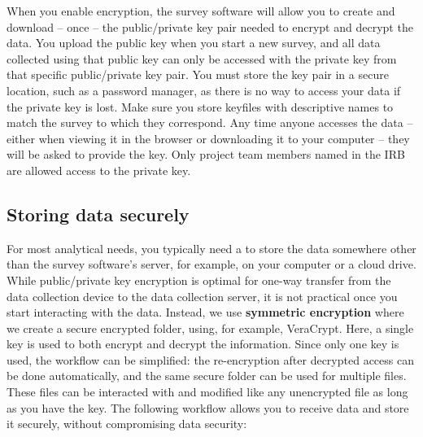 When you enable encryption, the survey software will allow you to create and
download -- once -- the public/private key pair needed to encrypt and decrypt the data.
You upload the public key when you start a new survey, and all data collected using that
public key can only be accessed with the private key from that specific public/private key pair.
You must store the key pair in a secure location, such as a password manager,
as there is no way to access your data if the private key is lost.
Make sure you store keyfiles with descriptive names to match the survey to which they correspond.
Any time anyone accesses the data --
either when viewing it in the browser or downloading it to your computer --
they will be asked to provide the key.
Only project team members named in the IRB are allowed access to the private key.

\subsection{Storing data securely}

For most analytical needs, you typically need a to store the data somewhere other
than the survey software's server, for example, on your computer or a cloud drive.
While public/private key encryption is optimal for one-way transfer
from the data collection device to the data collection server,
it is not practical once you start interacting with the data.
Instead, we use \textbf{symmetric encryption}
where we create a secure encrypted folder,
using, for example, VeraCrypt.
Here, a single key is used to both encrypt and decrypt the information.
Since only one key is used, the workflow can be simplified:
the re-encryption after decrypted access can be done automatically,
and the same secure folder can be used for multiple files.
These files can be interacted with and modified like any unencrypted file as long as you have the key.
The following workflow allows you to receive data and store it securely,
without compromising data security:

